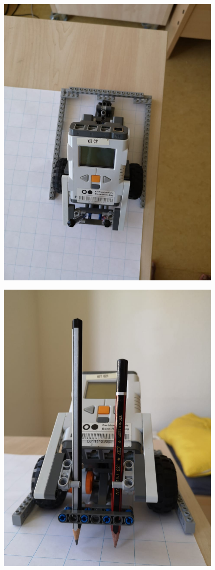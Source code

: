 \documentclass[11pt,a4paper,titlepage]{article}
\begin{document}
\begin{figure}[H]
\centering
  \centering
  \includegraphics[width=0.8\linewidth]{Top}
  \label{fig:test1}
\end{figure}
\begin{figure}[H]
\centering
  \centering
  \includegraphics[width=0.8\linewidth]{front}
  \label{fig:test1}
\end{figure}
\end{document}
